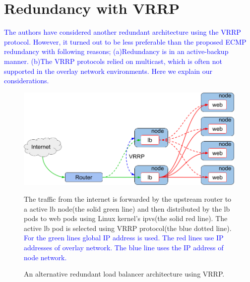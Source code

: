 
\appendix

\section{Redundancy with VRRP}\label{appendix:Redundancy with VRRP}

\textcolor{blue}{
The authors have considered another redundant architecture using the VRRP protocol.
However, it turned out to be less preferable than the proposed ECMP redundancy with following reasons;
(a)Redundancy is in an active-backup manner.
(b)The VRRP protocols relied on multicast, which is often not supported in the overlay network environments.
Here we explain our considerations.
}

\begin{figure}[h]
\begin{center}
\includegraphics[width=\columnwidth]{Figs/vrrp.png}
\end{center}
\caption{ An alternative redundant load balancer architecture using VRRP.}
  The traffic from the internet is forwarded by the upstream router to a active lb node(the solid green line) and then distributed by the lb pods to web pods using Linux kernel's ipvs(the solid red line).
  The active lb pod is selected using VRRP protocol(the blue dotted line).
\textcolor{blue}{
  For the green lines global IP address is used. The red lines use IP addresses of overlay network. The blue line uses the IP address of node network.
}

\label{fig:vrrp}
\end{figure}

